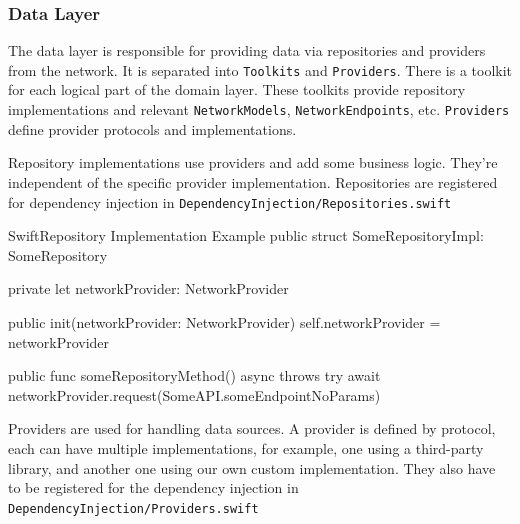 \documentclass[
  biblatex = false,
  language=english,
  figures=false,
  sourcecodes,
  glossaries,
  index
]{kidiplom}
\begin{document}
\subsubsection{Data Layer}
The data layer is responsible for providing data via repositories and providers from the network. It is separated into \texttt{Toolkits} and \texttt{Providers}. There is a toolkit for each logical part of the domain layer. These toolkits provide repository implementations and relevant \texttt{NetworkModels}, \texttt{NetworkEndpoints}, etc. \texttt{Providers} define provider protocols and implementations.

Repository implementations use providers and add some business logic. They're independent of the specific provider implementation. Repositories are registered for dependency injection in \texttt{DependencyInjection/Repositories.swift}

\begin{kicode}{Swift}{}{Repository Implementation Example}
public struct SomeRepositoryImpl: SomeRepository {
    
    private let networkProvider: NetworkProvider
    
    public init(networkProvider: NetworkProvider) {
        self.networkProvider = networkProvider
    }
    
    public func someRepositoryMethod() async throws {
        try await networkProvider.request(SomeAPI.someEndpointNoParams)
    }
}
\end{kicode}

Providers are used for handling data sources. A provider is defined by protocol, each can have multiple implementations, for example, one using a third-party library, and another one using our own custom implementation. They also have to be registered for the dependency injection in \texttt{DependencyInjection/Providers.swift}
\end{document}
